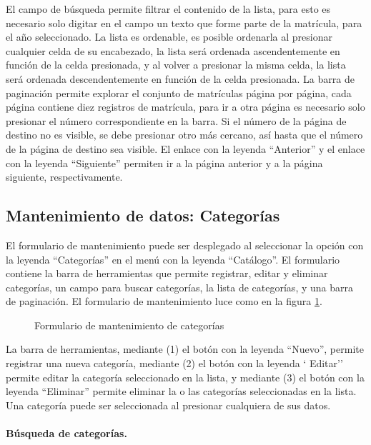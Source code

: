 \documentclass[a4paper, 9pt, conference]{article}              %
\begin{document}
El campo de b\'usqueda permite filtrar el contenido de la lista, para esto es necesario solo digitar en el campo un texto que forme parte de la matr\'icula, para el a\~no seleccionado. La lista es ordenable, es posible ordenarla al presionar cualquier celda de su encabezado, la lista ser\'a ordenada ascendentemente en funci\'on de la celda presionada, y al volver a presionar la misma celda, la lista ser\'a ordenada descendentemente en funci\'on de la celda presionada. La barra de paginaci\'on permite explorar el conjunto de matr\'iculas p\'agina por p\'agina, cada p\'agina contiene diez registros de matr\'icula, para ir a otra p\'agina es necesario solo presionar el n\'umero correspondiente en la barra. Si el n\'umero de la p\'agina de destino no es visible, se debe presionar otro m\'as cercano, as\'i hasta que el n\'umero de la p\'agina de destino sea visible. El enlace con la leyenda ``Anterior'' y el enlace con la leyenda ``Siguiente'' permiten ir a la p\'agina anterior y a la p\'agina siguiente, respectivamente.


\subsection{Mantenimiento de datos: Categor\'ias}

El formulario de mantenimiento puede ser desplegado al seleccionar la opci\'on con la leyenda ``Categor\'ias'' en el men\'u con la leyenda ``Cat\'alogo''. El formulario contiene la barra de herramientas que permite registrar, editar y eliminar categor\'ias, un campo para buscar categor\'ias, la lista de categor\'ias, y una barra de paginaci\'on. El formulario de mantenimiento luce como en la figura \ref{fig:catalogcategories}.

\begin{figure}
	\centering
		\caption{Formulario de mantenimiento de categor\'ias}
	\label{fig:catalogcategories}
\end{figure}

La barra de herramientas, mediante (1) el bot\'on con la leyenda ``Nuevo'', permite registrar una nueva categor\'ia, mediante (2) el bot\'on con la leyenda ` Editar'' permite editar la categor\'ia seleccionado en la lista, y mediante (3) el bot\'on con la leyenda ``Eliminar'' permite eliminar la o las categor\'ias seleccionadas en la lista. Una categor\'ia puede ser seleccionada al presionar cualquiera de sus datos.

\paragraph{B\'usqueda de categor\'ias.}
\end{document}
